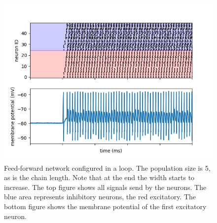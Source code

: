 \documentclass[a4paper,twocolumn]{article}
\begin{document}
\begin{figure}
    \centering
    \includegraphics[width=.5\textwidth]{figures/feedforward-signals-loop.png}
    \caption{Feed-forward network configured in a loop. The population size is
        5, as is the chain length. Note that at the end the width starts to
        increase.  The top figure shows all signals send by the neurons. The
        blue area represents inhibitory neurons, the red excitatory. The bottom
        figure shows the membrane potential of the first excitatory neuron.}
    \label{fig:feed-forward-loop}
\end{figure}
\end{document}
